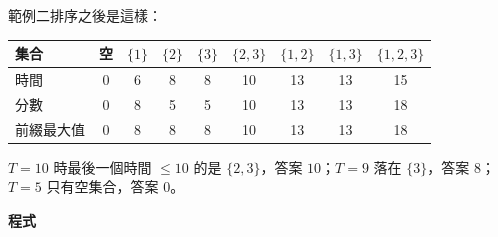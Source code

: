 範例二排序之後是這樣：

\begin{center}
\begin{tabular}{lcccccccc}
\toprule
集合 & 空 & $\{1\}$ & $\{2\}$ & $\{3\}$ & $\{2, 3\}$ & $\{1, 2\}$ & $\{1, 3\}$ & $\{1, 2, 3\}$ \\
\midrule
時間 & 0 & 6 & 8 & 8 & 10 & 13 & 13 & 15 \\
分數 & 0 & 8 & 5 & 5 & 10 & 13 & 13 & 18 \\
前綴最大值 & 0 & 8 & 8 & 8 & 10 & 13 & 13 & 18 \\
\bottomrule
\end{tabular}
\end{center}

$T = 10$ 時最後一個時間 $\le 10$ 的是 $\{2, 3\}$，答案 $10$；$T = 9$ 落在
$\{3\}$，答案 $8$；$T = 5$ 只有空集合，答案 $0$。

\textbf{程式}

